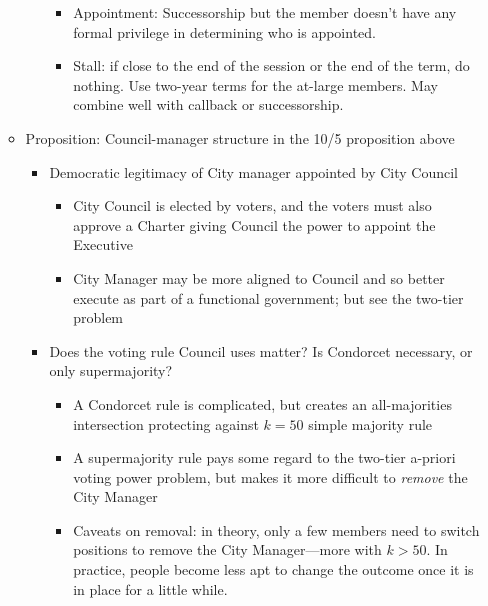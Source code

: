 \begin{itemize}
\begin{itemize}
\begin{itemize}
\begin{itemize}
                \item Appointment:  Successorship but the member doesn't have any formal privilege in determining who is appointed.

                \item Stall:  if close to the end of the session or the end of the term, do nothing.  Use two-year terms for the at-large members.  May combine well with callback or successorship.
            \end{itemize}
        \end{itemize}

        \item Proposition:  Council-manager structure in the 10/5 proposition above
        \begin{itemize}
            \item Democratic legitimacy of City manager appointed by City Council
            \begin{itemize}
                \item City Council is elected by voters, and the voters must also approve a Charter giving Council the power to appoint the Executive

                \item City Manager may be more aligned to Council and so better execute as part of a functional government; but see the two-tier problem
            \end{itemize}

            \item Does the voting rule Council uses matter?  Is Condorcet necessary, or only supermajority?
            \begin{itemize}
                \item A Condorcet rule is complicated, but creates an all-majorities intersection protecting against $k=50$ simple majority rule

                \item A supermajority rule pays some regard to the two-tier a-priori voting power problem, but makes it more difficult to \textit{remove} the City Manager

                \item Caveats on removal:  in theory, only a few members need to switch positions to remove the City Manager—more with $k>50$.  In practice, people become less apt to change the outcome once it is in place for a little while.
            \end{itemize}


\end{itemize}
\end{itemize}
\end{itemize}

